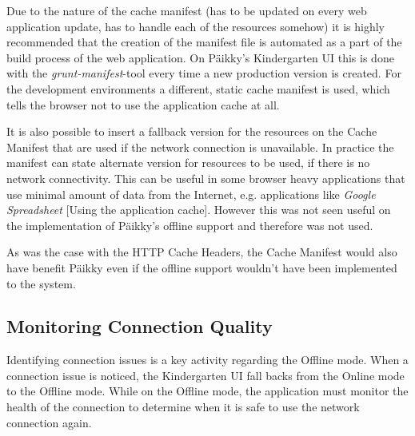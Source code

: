 Due to the nature of the cache manifest (has to be updated on every web application update, has to handle each of the resources somehow) it is highly recommended that the creation of the manifest file is automated as a part of the build process of the web application. On Päikky's Kindergarten UI this is done with the \textit{grunt-manifest}-tool every time a new production version is created. For the development environments a different, static cache manifest is used, which tells the browser not to use the application cache at all.

It is also possible to insert a fallback version for the resources on the Cache Manifest that are used if the network connection is unavailable. In practice the manifest can state alternate version for resources to be used, if there is no network connectivity. This can be useful in some browser heavy applications that use minimal amount of data from the Internet, e.g. applications like \textit{Google Spreadsheet} [Using the application cache]. However this was not seen useful on the implementation of Päikky's offline support and therefore was not used. %

As was the case with the HTTP Cache Headers, the Cache Manifest would also have benefit Päikky even if the offline support wouldn't have been implemented to the system.







\subsection{Monitoring Connection Quality}
Identifying connection issues is a key activity regarding the Offline mode. When a connection issue is noticed, the Kindergarten UI fall backs from the Online mode to the Offline mode. While on the Offline mode, the application must monitor the health of the connection to determine when it is safe to use the network connection again.

